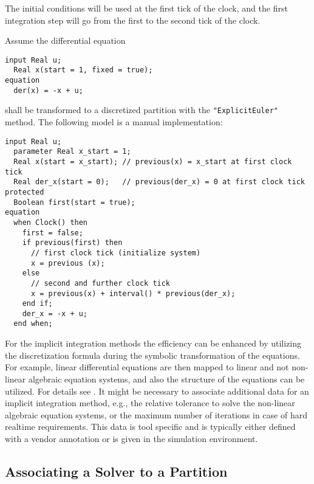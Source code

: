 The initial conditions will be used at the first tick of the clock, and
the first integration step will go from the first to the second tick of
the clock.

\begin{example}
Assume the differential equation
\begin{lstlisting}[language=modelica]
  input Real u;
  Real x(start = 1, fixed = true);
equation
  der(x) = -x + u;
\end{lstlisting}
shall be transformed to a discretized partition with the \lstinline!"ExplicitEuler"! method.
The following model is a manual implementation:
\begin{lstlisting}[language=modelica]
  input Real u;
  parameter Real x_start = 1;
  Real x(start = x_start); // previous(x) = x_start at first clock tick
  Real der_x(start = 0);   // previous(der_x) = 0 at first clock tick
protected
  Boolean first(start = true);
equation
  when Clock() then
    first = false;
    if previous(first) then
      // first clock tick (initialize system)
      x = previous (x);
    else
      // second and further clock tick
      x = previous(x) + interval() * previous(der_x);
    end if;
    der_x = -x + u;
  end when;
\end{lstlisting}
\end{example}

\begin{nonnormative}
For the implicit integration methods the efficiency can be enhanced by utilizing the discretization formula during the symbolic transformation of the equations.
For example, linear differential equations are then mapped to linear and not non-linear algebraic equation systems, and also the structure of the equations can be utilized.
For details see \textcite{ElmqvistOtterCellier1995InlineIntegration}.
It might be necessary to associate additional data for an implicit integration method, e.g., the relative tolerance to solve the non-linear algebraic equation systems, or the maximum number of iterations in case of hard realtime requirements.
This data is tool specific and is typically either defined with a vendor annotation or is given in the simulation environment.
\end{nonnormative}

\subsection{Associating a Solver to a Partition}\label{associating-a-solver-to-a-partition}

